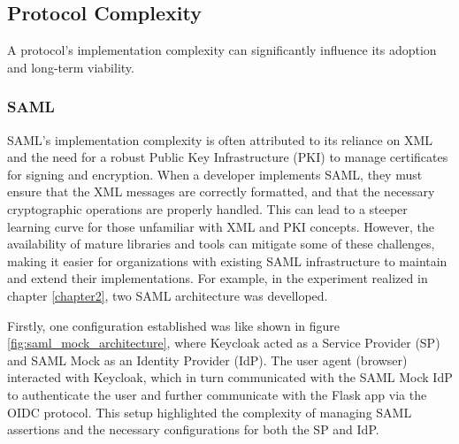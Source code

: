 \documentclass[../memoire.tex]{subfiles}
\begin{document}
\subsection{Protocol Complexity}

A protocol's implementation complexity can significantly influence its adoption and long-term viability. 


\subsubsection{SAML}

SAML's implementation complexity is often attributed to its reliance on XML and the need for a robust Public Key Infrastructure (PKI) to manage certificates for signing and encryption. When a developer implements SAML, they must ensure that the XML messages are correctly formatted, and that the necessary cryptographic operations are properly handled. This can lead to a steeper learning curve for those unfamiliar with XML and PKI concepts. However, the availability of mature libraries and tools can mitigate some of these challenges, making it easier for organizations with existing SAML infrastructure to maintain and extend their implementations. For example, in the experiment realized in chapter \ref{chapter2}, two SAML architecture was develloped. 

Firstly, one configuration established was like shown in figure \ref{fig:saml_mock_architecture}, where Keycloak acted as a Service Provider (SP) and SAML Mock as an Identity Provider (IdP). The user agent (browser) interacted with Keycloak, which in turn communicated with the SAML Mock IdP to authenticate the user and further communicate with the Flask app via the OIDC protocol. This setup highlighted the complexity of managing SAML assertions and the necessary configurations for both the SP and IdP.
\end{document}
